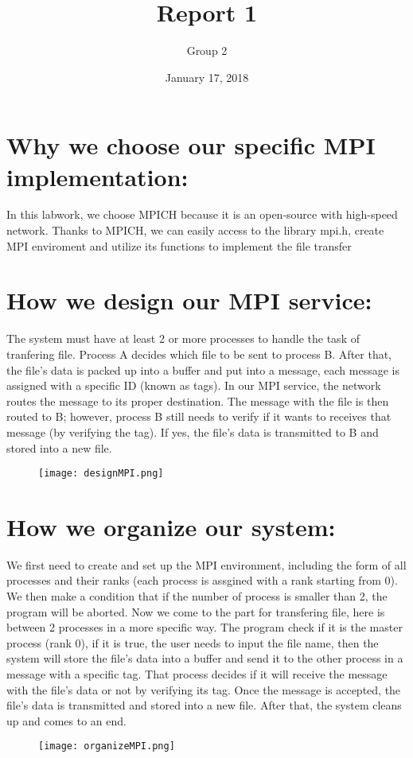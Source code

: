 \documentclass[12pt]{article}
\title{Report 1}
\author{Group 2}
\date{January 17, 2018}
\begin{document}
\maketitle
  \section{Why we choose our specific MPI implementation:}
    In this labwork, we choose MPICH because it is an open-source with high-speed network. Thanks to MPICH, we can easily access to the library mpi.h, create MPI enviroment and utilize its functions to implement the file transfer 
  
  \section{How we design our MPI service:}
    The system must have at least 2 or more processes to handle the task of tranfering file. Process A decides which file to be sent to process B. After that, the file's data is packed up into a buffer and put into a message, each message is assigned with a specific ID (known as tags). In our MPI service, the network routes the message to its proper destination. The message with the file is then routed to B; however, process B still needs to verify if it wants to receives that message (by verifying the tag). If yes, the file's data is transmitted to B and stored into a new file.
    \begin{figure}[h]
        \centering
       \texttt{[image: designMPI.png]}
    \end{figure}

  \section{How we organize our system:}
    We first need to create and set up the MPI environment, including the form of all processes and their ranks (each process is assgined with a rank starting from 0). We then make a condition that if the number of process is smaller than 2, the program will be aborted. Now we come to the part for transfering file, here is between 2 processes in a more specific way. The program check if it is the master process (rank 0), if it is true, the user needs to input the file name, then the system will store the file's data into a buffer and send it to the other process in a message with a specific tag. That process decides if it will receive the message with the file's data or not by verifying its tag. Once the message is accepted, the file's data is transmitted and stored into a new file. After that, the system cleans up and comes to an end. 
    \begin{figure}[h]
        \centering
       \texttt{[image: organizeMPI.png]}
    \end{figure}
\end{document}
